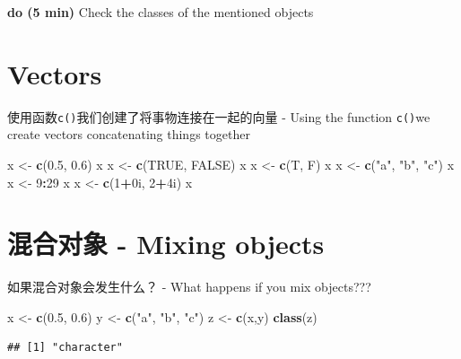 \documentclass[]{book}
\newenvironment{Shaded}{\begin{snugshade}}{\end{snugshade}}
\newcommand{\DecValTok}[1]{\textcolor[rgb]{0.00,0.00,0.81}{#1}}
\newcommand{\FloatTok}[1]{\textcolor[rgb]{0.00,0.00,0.81}{#1}}
\newcommand{\KeywordTok}[1]{\textcolor[rgb]{0.13,0.29,0.53}{\textbf{#1}}}
\newcommand{\NormalTok}[1]{#1}
\newcommand{\OperatorTok}[1]{\textcolor[rgb]{0.81,0.36,0.00}{\textbf{#1}}}
\newcommand{\OtherTok}[1]{\textcolor[rgb]{0.56,0.35,0.01}{#1}}
\newcommand{\StringTok}[1]{\textcolor[rgb]{0.31,0.60,0.02}{#1}}
\begin{document}
\textbf{do (5 min)}
Check the classes of the mentioned objects

\hypertarget{vectors}{%
\section{Vectors}\label{vectors}}

使用函数\texttt{c()}我们创建了将事物连接在一起的向量 - Using the function \texttt{c()}we create vectors concatenating things together

\begin{Shaded}
\begin{Highlighting}[]
\NormalTok{x <-}\StringTok{ }\KeywordTok{c}\NormalTok{(}\FloatTok{0.5}\NormalTok{, }\FloatTok{0.6}\NormalTok{)}
\NormalTok{x}
\NormalTok{x <-}\StringTok{ }\KeywordTok{c}\NormalTok{(}\OtherTok{TRUE}\NormalTok{, }\OtherTok{FALSE}\NormalTok{)}
\NormalTok{x}
\NormalTok{x <-}\StringTok{ }\KeywordTok{c}\NormalTok{(T, F)}
\NormalTok{x}
\NormalTok{x <-}\StringTok{ }\KeywordTok{c}\NormalTok{(}\StringTok{"a"}\NormalTok{, }\StringTok{"b"}\NormalTok{, }\StringTok{"c"}\NormalTok{)}
\NormalTok{x}
\NormalTok{x <-}\StringTok{ }\DecValTok{9}\OperatorTok{:}\DecValTok{29}
\NormalTok{x}
\NormalTok{x <-}\StringTok{ }\KeywordTok{c}\NormalTok{(}\DecValTok{1}\OperatorTok{+}\NormalTok{0i, }\DecValTok{2}\OperatorTok{+}\NormalTok{4i)}
\NormalTok{x}
\end{Highlighting}
\end{Shaded}

\hypertarget{mixing-objects}{%
\section{混合对象 - Mixing objects}\label{mixing-objects}}

如果混合对象会发生什么？ - What happens if you mix objects???

\begin{Shaded}
\begin{Highlighting}[]
\NormalTok{x <-}\StringTok{ }\KeywordTok{c}\NormalTok{(}\FloatTok{0.5}\NormalTok{, }\FloatTok{0.6}\NormalTok{)}
\NormalTok{y <-}\StringTok{ }\KeywordTok{c}\NormalTok{(}\StringTok{"a"}\NormalTok{, }\StringTok{"b"}\NormalTok{, }\StringTok{"c"}\NormalTok{)}
\NormalTok{z <-}\StringTok{ }\KeywordTok{c}\NormalTok{(x,y)}
\KeywordTok{class}\NormalTok{(z)}
\end{Highlighting}
\end{Shaded}

\begin{verbatim}
## [1] "character"
\end{verbatim}
\end{document}
